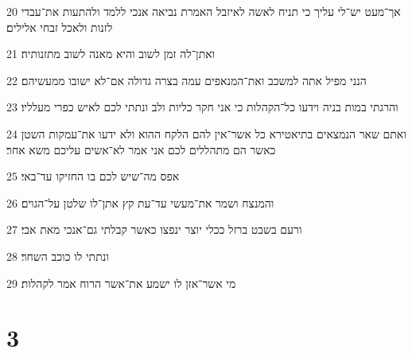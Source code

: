 \par 20 אך־מעט יש־לי עליך כי תניח לאשה לאיזבל האמרת נביאה אנכי ללמד ולהתעות את־עבדי לזנות ולאכל זבחי אלילים׃
\par 21 ואתן־לה זמן לשוב והיא מאנה לשוב מתזנותיה׃
\par 22 הנני מפיל אתה למשכב ואת־המנאפים עמה בצרה גדולה אם־לא ישובו ממעשיהם׃
\par 23 והרגתי במות בניה וידעו כל־הקהלות כי אני חקר כליות ולב ונתתי לכם לאיש כפרי מעלליו׃
\par 24 ואתם שאר הנמצאים בתיאטירא כל אשר־אין להם הלקח ההוא ולא ידעו את־עמקות השטן כאשר הם מתהללים לכם אני אמר לא־אשים עליכם משא אחר׃
\par 25 אפס מה־שיש לכם בו החזיקו עד־באי׃
\par 26 והמנצח ושמר את־מעשי עד־עת קץ אתן־לו שלטן על־הגוים׃
\par 27 ורעם בשבט ברזל ככלי יוצר ינפצו כאשר קבלתי גם־אנכי מאת אבי׃
\par 28 ונתתי לו כוכב השחר׃
\par 29 מי אשר־אזן לו ישמע את־אשר הרוח אמר לקהלות׃

\chapter{3}

